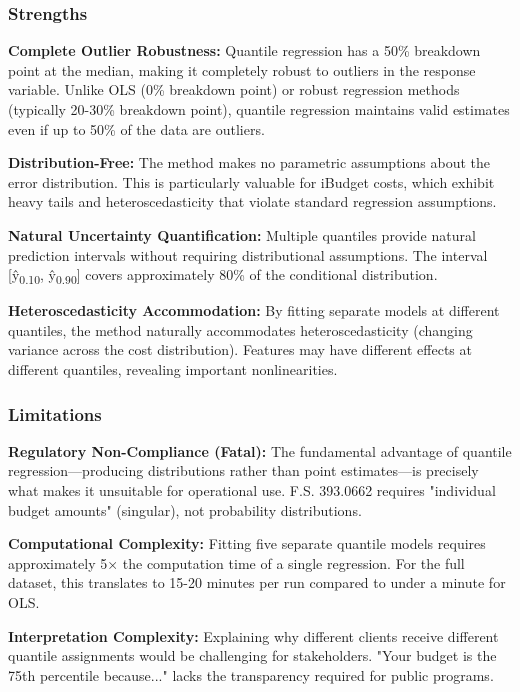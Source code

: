 \subsubsection{Strengths}

\textbf{Complete Outlier Robustness:}
Quantile regression has a 50\% breakdown point at the median, making it completely robust to outliers in the response variable. Unlike OLS (0\% breakdown point) or robust regression methods (typically 20-30\% breakdown point), quantile regression maintains valid estimates even if up to 50\% of the data are outliers.

\textbf{Distribution-Free:}
The method makes no parametric assumptions about the error distribution. This is particularly valuable for iBudget costs, which exhibit heavy tails and heteroscedasticity that violate standard regression assumptions.

\textbf{Natural Uncertainty Quantification:}
Multiple quantiles provide natural prediction intervals without requiring distributional assumptions. The interval [\^{y}\textsubscript{0.10}, \^{y}\textsubscript{0.90}] covers approximately 80\% of the conditional distribution.

\textbf{Heteroscedasticity Accommodation:}
By fitting separate models at different quantiles, the method naturally accommodates heteroscedasticity (changing variance across the cost distribution). Features may have different effects at different quantiles, revealing important nonlinearities.

\subsubsection{Limitations}

\textbf{Regulatory Non-Compliance (Fatal):}
The fundamental advantage of quantile regression—producing distributions rather than point estimates—is precisely what makes it unsuitable for operational use. F.S. 393.0662 requires "individual budget amounts" (singular), not probability distributions.

\textbf{Computational Complexity:}
Fitting five separate quantile models requires approximately 5× the computation time of a single regression. For the full dataset, this translates to 15-20 minutes per run compared to under a minute for OLS.

\textbf{Interpretation Complexity:}
Explaining why different clients receive different quantile assignments would be challenging for stakeholders. "Your budget is the 75th percentile because..." lacks the transparency required for public programs.

